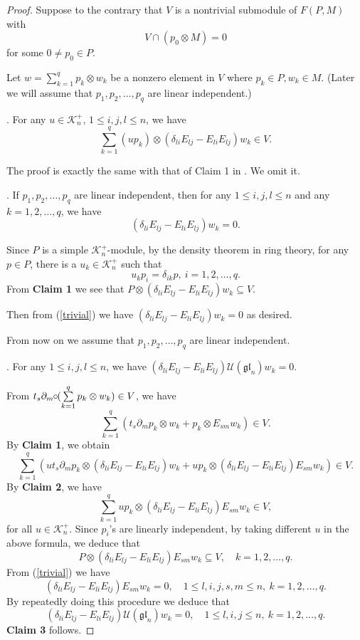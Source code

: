 \documentclass[12pt, a4paper]{amsart}
\newcommand{\ptl}{\partial}
\newcommand{\U}{\mathcal{U}}
\def\gl{\mathfrak{gl}}
\theoremstyle{Theorem}
\theoremstyle{Theorem}
\numberwithin{equation}{section}
\begin{document}
\begin{proof} Suppose to the contrary that $V$ is a nontrivial submodule of $F(P,M)$ with
	\begin{equation}\label{trivial}V\cap(p_0\otimes M)=0\end{equation} for some $0\ne p_0\in P$.
	
	Let $w=\sum\limits_{k=1}^{q} p_k\otimes w_k$ be a nonzero element in $V$ where $p_k\in P, w_k\in M$.
	(Later we will assume  that $p_1,p_{2},\dots,p_q$ are linear independent.)
	
	. For any $u\in \mathcal{K}_n^+$, $1\le i, j, l\le n$, we have
	\begin{equation*}\sum_{k =1}^q(u p_k)\otimes (\delta_{li}E_{lj}- E_{li} E_{lj})w_k\in V.\end{equation*}
	
	The proof is exactly the same with that of Claim 1 in \cite[Theorem 3.1]{LLZ}. We omit it.
	
	. If $p_1,p_{2},\dots, p_q$ are linear independent,
	then for any $1\le i, j, l\le n$ and any $k=1,2,\dots,q$, we have
	$$ (\delta_{li}E_{lj}- E_{li} E_{lj})w_k=0.$$
	
	Since $P$ is a simple $\mathcal{K}_n^+$-module, by the density theorem in ring theory, for any
	$p\in P$, there is a $u_k\in \mathcal{K}_n^+$ such that
	$$u_kp_i=\delta_{ik}p,\ i=1,2,\dots, q.$$
	From {\bf Claim 1} we see that $P \otimes (\delta_{li}E_{lj}- E_{li} E_{lj})w_k\subseteq V.$
	
	Then from (\ref{trivial}) we have $(\delta_{li}E_{lj}- E_{li} E_{lj})w_k=0$ as desired.
	
	From now on we assume that $p_1,p_{2},\dots, p_q$ are linear independent.
	
	. For any  $1\le i, j, l\le n$,  we have  $(\delta_{li}E_{lj}- E_{li} E_{lj})\U(\gl_n)w_k=0$.
	
	From $t_s\ptl_m \hskip -3pt \circ \hskip -3pt (\sum\limits_{k =1}^q p_k\otimes w_k)\in V$, we have
	$$\sum_{k =1}^q (t_s\ptl_m p_k\otimes w_k+  p_k\otimes E_{sm}w_k)\in V.$$
	By {\bf Claim 1}, we obtain $$\sum_{k =1}^q (ut_s\ptl_m p_k\otimes (\delta_{li}E_{lj}-E_{li} E_{lj})w_k+up_k\otimes (\delta_{li}E_{lj}- E_{li} E_{lj})E_{sm}w_k)\in V.$$
	By {\bf Claim 2}, we have
	$$\sum_{k =1}^q up_k\otimes (\delta_{li}E_{lj}- E_{li} E_{lj})E_{sm}w_k\in V,$$ for all $u\in \mathcal{K}_n^+$.
	Since $p_i$'s are linearly independent,  by taking different $u$ in the above formula, we deduce that  $$P \otimes (\delta_{li}E_{lj}- E_{li} E_{lj})E_{sm}w_k\subseteq V,\quad  k=1,2,\dots,q.$$
	From (\ref{trivial}) we have
	$$(\delta_{li}E_{lj}- E_{li} E_{lj})E_{sm}w_k=0,\quad 1\leq l, i, j, s, m\leq n,\ k=1,2,\dots,q. $$
	By repeatedly doing this procedure we deduce that
	$$(\delta_{li}E_{lj}- E_{li} E_{lj})\U(\gl_n)w_k=0,\quad 1\leq l, i, j\leq n,\ k=1,2,\dots,q. $$ {\bf Claim 3} follows.
	

\end{proof}
\end{document}
